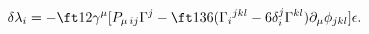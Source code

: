 \begin{equation}
\delta\lambda_i=-\ft12\gamma^\mu[P_{\mu\,ij}\Gamma^j
-\ft1{36}(\Gamma_i{}^{jkl}-6\delta_i^j\Gamma^{kl})\partial_\mu\phi_{jkl}]
\epsilon.
\end{equation}

